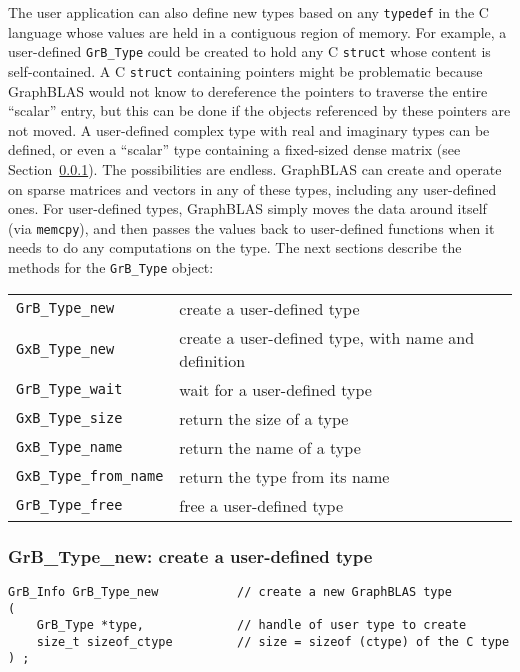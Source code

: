 \documentclass[12pt]{article}
\begin{document}
The user application can also define new types based on any \verb'typedef' in
the C language whose values are held in a contiguous region of memory.  For
example, a user-defined \verb'GrB_Type' could be created to hold any C
\verb'struct' whose content is self-contained.  A C \verb'struct' containing
pointers might be problematic because GraphBLAS would not know to dereference
the pointers to traverse the entire ``scalar'' entry, but this can be done if
the objects referenced by these pointers are not moved.  A user-defined complex
type with real and imaginary types can be defined, or even a ``scalar'' type
containing a fixed-sized dense matrix (see Section~\ref{type_new}).  The
possibilities are endless.  GraphBLAS can create and operate on sparse matrices
and vectors in any of these types, including any user-defined ones.  For
user-defined types, GraphBLAS simply moves the data around itself (via
\verb'memcpy'), and then passes the values back to user-defined functions when
it needs to do any computations on the type.  The next sections describe the
methods for the \verb'GrB_Type' object:

\vspace{0.2in}
{\footnotesize
\begin{tabular}{ll}
\hline
\verb'GrB_Type_new'      & create a user-defined type \\
\verb'GxB_Type_new'      & create a user-defined type, with name and definition \\
\verb'GrB_Type_wait'     & wait for a user-defined type \\
\verb'GxB_Type_size'     & return the size of a type \\
\verb'GxB_Type_name'     & return the name of a type \\
\verb'GxB_Type_from_name'& return the type from its name \\
\verb'GrB_Type_free'     & free a user-defined type \\
\hline
\end{tabular}
}
\vspace{0.2in}

\subsubsection{{\sf GrB\_Type\_new:} create a user-defined type}
\label{type_new}

\begin{mdframed}[userdefinedwidth=6in]
{\footnotesize
\begin{verbatim}
GrB_Info GrB_Type_new           // create a new GraphBLAS type
(
    GrB_Type *type,             // handle of user type to create
    size_t sizeof_ctype         // size = sizeof (ctype) of the C type
) ;
\end{verbatim}
}\end{mdframed}
\end{document}
